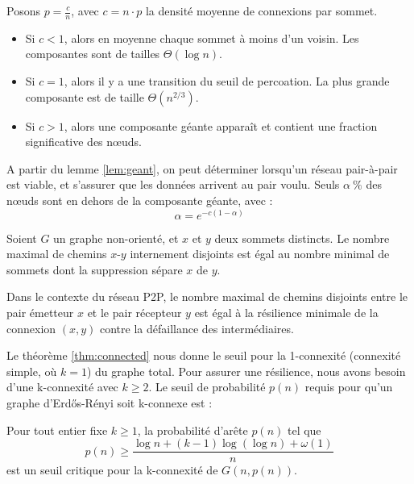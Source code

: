 \documentclass[french]{llncs}
\begin{document}
\begin{lemma}\label{lem:geant}
  Posons \(p = \frac{c}{n}\), avec \(c = n \cdot p\) la densité moyenne de 
connexions par sommet.
  \begin{itemize}
      \item Si \(c<1\), alors en moyenne chaque sommet à moins d'un voisin. Les 
composantes sont de tailles \(\Theta(\log n)\).
      \item Si \(c=1\), alors il y a une transition du seuil de percoation. La 
plus grande composante est de taille \(\Theta(n^{2/3})\).
      \item Si \(c>1\), alors une composante géante apparaît et contient une 
fraction significative des n\oe{}uds.
  \end{itemize}
\end{lemma}

A partir du lemme \ref{lem:geant}, on peut déterminer lorsqu'un réseau 
pair-à-pair est viable, et s'assurer que les données arrivent au pair voulu. 
Seuls \(\alpha~\%\) des n\oe{}uds sont en dehors de la composante géante, avec :
\[ \alpha = e^{-c(1-\alpha)} \]

\begin{theorem}[de Menger]\label{thm:menger}
    Soient \(G\) un graphe non-orienté, et \(x\) et \(y\) deux sommets 
distincts.
    Le nombre maximal de chemins  \(x\mbox{-}y\) internement disjoints est égal 
au nombre minimal de sommets dont la suppression sépare \(x\) de \(y\).
\end{theorem}

Dans le contexte du réseau P2P, le nombre maximal de chemins disjoints entre le 
pair émetteur \(x\) et le pair récepteur \(y\) est égal à la résilience 
minimale de la connexion \((x,y)\) contre la défaillance des intermédiaires.

Le théorème \ref{thm:connected} nous donne le seuil pour la 1-connexité 
(connexité simple, où \(k=1\)) du graphe total.
Pour assurer une résilience, nous avons besoin d'une k-connexité avec 
\(k\geq2\). Le seuil de probabilité \(p(n)\) requis pour qu'un graphe 
d'Erdős-Rényi soit k-connexe est :

\begin{theorem}\label{thm:k-connected}
    Pour tout entier fixe \(k\geq1\), la probabilité d'arête \(p(n)\) tel que
    \begin{equation*}
        p(n) \geq \dfrac{\log n + (k-1)\log(\log n)+\omega(1)}{n}
    \end{equation*}
    est un seuil critique pour la k-connexité de \(G(n,p(n))\).
\end{theorem}
\end{document}
